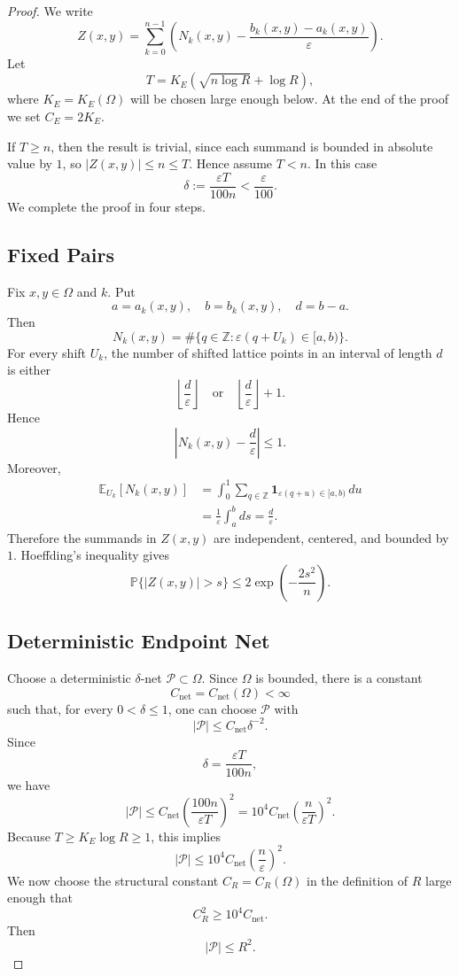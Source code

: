 \documentclass[11pt]{article}
\newcommand{\Z}{\mathbb Z}
\newcommand{\E}{\mathbb E}
\newcommand{\Prob}{\mathbb P}
\newcommand{\eps}{\varepsilon}
\begin{document}
\begin{proof}
We write
\[
        Z(x,y)=
        \sum_{k=0}^{n-1}
        \left(
        N_k(x,y)
        -
        \frac{b_k(x,y)-a_k(x,y)}{\eps}
        \right).
\]
Let
\[
        T=K_E\left(\sqrt{n\log R}+\log R\right),
\]
where $K_E=K_E(\Omega)$ will be chosen large enough below. At the end of the proof we set $C_E=2K_E$.

\bigskip
\noindent
If $T\ge n$, then the result is trivial, since each summand is bounded in absolute value by $1$, so $|Z(x,y)|\le n\le T$. Hence assume $T<n$. In this case
\[
        \delta:=\frac{\eps T}{100n}<\frac{\eps}{100}.
\]
We complete the proof in four steps.

\subsection{Fixed Pairs}

Fix $x,y\in\Omega$ and $k$. Put
\[
        a=a_k(x,y),
        \quad
        b=b_k(x,y),
        \quad
        d=b-a.
\]
Then
\[
        N_k(x,y)
        =
        \#\{q\in\Z:\eps(q+U_k)\in[a,b)\}.
\]
For every shift $U_k$, the number of shifted lattice points in an interval of length $d$ is either
\[
        \left\lfloor\frac d\eps\right\rfloor
        \quad\text{or}\quad
        \left\lfloor\frac d\eps\right\rfloor+1.
\]
Hence
\[
        \left|
        N_k(x,y)-\frac d\eps
        \right|\le1.
\]
Moreover,
\[
\begin{aligned}
        \E_{U_k}\left[N_k(x,y)\right]
        &=
        \int_0^1
        \sum_{q\in\Z}
        \mathbf 1_{\eps(q+u)\in[a,b)}
        \,du  \\
        &=
        \frac1\eps\int_a^b ds
        =
        \frac d\eps.
\end{aligned}
\]
Therefore the summands in $Z(x,y)$ are independent, centered, and bounded by $1$. Hoeffding's inequality \cite{Hoeffding1963} gives
\[
        \Prob\{|Z(x,y)|>s\}
        \le
        2\exp\left(-\frac{2s^2}{n}\right).
\]

\subsection{Deterministic Endpoint Net}

Choose a deterministic $\delta$-net $\mathcal P\subset\Omega$. Since $\Omega$ is bounded, there is a constant
\[
        C_{\mathrm{net}}=C_{\mathrm{net}}(\Omega)<\infty
\]
such that, for every $0<\delta\le1$, one can choose $\mathcal P$ with
\[
        |\mathcal P|\le C_{\mathrm{net}}\delta^{-2}.
\]
Since
\[
        \delta=\frac{\eps T}{100n},
\]
we have
\[
        |\mathcal P|
        \le
        C_{\mathrm{net}}
        \left(\frac{100n}{\eps T}\right)^2
        =
        10^4 C_{\mathrm{net}}
        \left(\frac{n}{\eps T}\right)^2.
\]
Because $T\ge K_E\log R\ge1$, this implies
\[
        |\mathcal P|
        \le
        10^4 C_{\mathrm{net}}
        \left(\frac{n}{\eps}\right)^2.
\]
We now choose the structural constant $C_R=C_R(\Omega)$ in the definition of $R$ large enough that
\[
        C_R^2\ge 10^4 C_{\mathrm{net}}.
\]
Then
\[
        |\mathcal P|\le R^2.
\]


\end{proof}
\end{document}
